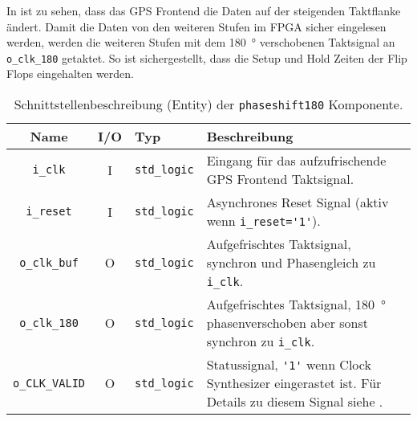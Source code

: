 In  ist zu sehen, dass das GPS Frontend die Daten auf der steigenden Taktflanke ändert. Damit die Daten von den weiteren Stufen im FPGA sicher eingelesen werden, werden die weiteren Stufen mit dem \SI{180}{\degree} verschobenen Taktsignal an \lstinline$o_clk_180$ getaktet. So ist sichergestellt, dass die Setup und Hold Zeiten der Flip Flops eingehalten werden.


\begin{table}[htbp]
    \ttabbox
    {
        \caption[Clock Synthesizer Schnittstelle]{Schnittstellenbeschreibung (Entity) der \lstinline$phaseshift180$ Komponente.}
        \label{TabPhaseshift180_Entity}
    }
    {
    \begin{tabular}{c c  l p{5.5cm}}
        \toprule
        Name                    & I/O   & Typ                   & Beschreibung \\
        \midrule
        \lstinline$i_clk$       & I     & \lstinline$std_logic$ & Eingang für das aufzufrischende GPS Frontend Taktsignal. \\
        \lstinline$i_reset$     & I     & \lstinline$std_logic$ & Asynchrones Reset Signal (aktiv wenn \lstinline$i_reset='1'$). \\
        \lstinline$o_clk_buf$   & O     & \lstinline$std_logic$ & Aufgefrischtes Taktsignal, synchron und Phasengleich zu \lstinline$i_clk$. \\
        \lstinline$o_clk_180$   & O     & \lstinline$std_logic$ & Aufgefrischtes Taktsignal, \SI{180}{\degree} phasenverschoben aber sonst synchron zu \lstinline$i_clk$. \\
        \lstinline$o_CLK_VALID$ & O     & \lstinline$std_logic$ & Statussignal, \lstinline$'1'$ wenn Clock Synthesizer eingerastet ist. Für Details zu diesem Signal siehe \cite{SP6Clock}.\\
        \bottomrule
    \end{tabular}
}
\end{table}
